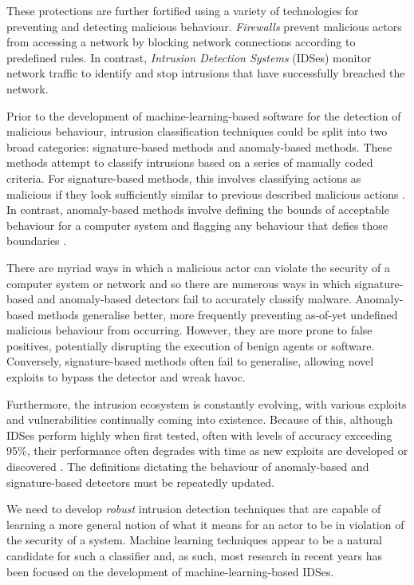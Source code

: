 \documentclass[msc,deptreport, cs]{infthesis} %
\begin{document}
These protections are further fortified using a variety of technologies for preventing and detecting malicious behaviour. \textit{Firewalls} prevent malicious actors from accessing a network by blocking network connections according to predefined rules. In contrast, \textit{Intrusion Detection Systems} (IDSes) monitor network traffic to identify and stop intrusions that have successfully breached the network. 

Prior to the development of machine-learning-based software for the detection of malicious behaviour, intrusion classification techniques could be split into two broad categories: signature-based methods and anomaly-based methods. These methods attempt to classify intrusions based on a series of manually coded criteria. For signature-based methods, this involves classifying actions as malicious if they look sufficiently similar to previous described malicious actions \cite{vaidya2001dynamic}. In contrast, anomaly-based methods involve defining the bounds of acceptable behaviour for a computer system and flagging any behaviour that defies those boundaries \cite{garcia2009anomaly}. 

There are myriad ways in which a malicious actor can violate the security of a computer system or network and so there are numerous ways in which signature-based and anomaly-based detectors fail to accurately classify malware. Anomaly-based methods generalise better, more frequently preventing as-of-yet undefined malicious behaviour from occurring. However, they are more prone to false positives, potentially disrupting the execution of benign agents or software. Conversely, signature-based methods often fail to generalise, allowing novel exploits to bypass the detector and wreak havoc.

Furthermore, the intrusion ecosystem is constantly evolving, with various exploits and vulnerabilities continually coming into existence. Because of this, although IDSes perform highly when first tested, often with levels of accuracy exceeding 95\%, their performance often degrades with time as new exploits are developed or discovered \cite{chen2016more}. The definitions dictating the behaviour of anomaly-based and signature-based detectors must be repeatedly updated.

We need to develop \textit{robust} intrusion detection techniques that are capable of learning a more general notion of what it means for an actor to be in violation of the security of a system.  Machine learning techniques appear to be a natural candidate for such a classifier and, as such, most research in recent years has been focused on the development of machine-learning-based IDSes.
\end{document}
